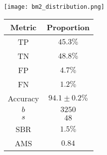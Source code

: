 \noindent\begin{minipage}{\textwidth}
\centering
  \begin{minipage}[htbp]{0.65\textwidth}
    \centering
    \texttt{[image: bm2\_distribution.png]}
    \label{fig:dist_bm2}
  \end{minipage}
  \hfill
  \begin{minipage}[htbp]{0.34\textwidth}
        \centering
        \begin{tabular}{c|c} 
        \toprule
        Metric & Proportion \\
        \midrule
        \rowcolor{gray!6} TP & $45.3 \%$ \\
        TN & $48.8 \%$ \\
        \rowcolor{gray!6} FP & $4.7 \%$\\
        FN & $1.2 \%$ \\
        \rowcolor{gray!6} Accuracy & $94.1 \pm 0.2 \%$ \\
        \midrule
        $b$ & $3250$ \\
        \rowcolor{gray!6} $s$ & $48$ \\
        SBR & $1.5\%$\\
        \rowcolor{gray!6} AMS & $0.84$ \\
        \bottomrule
        \end{tabular}
        \label{tab:Values2}
    \end{minipage}
\end{minipage}

